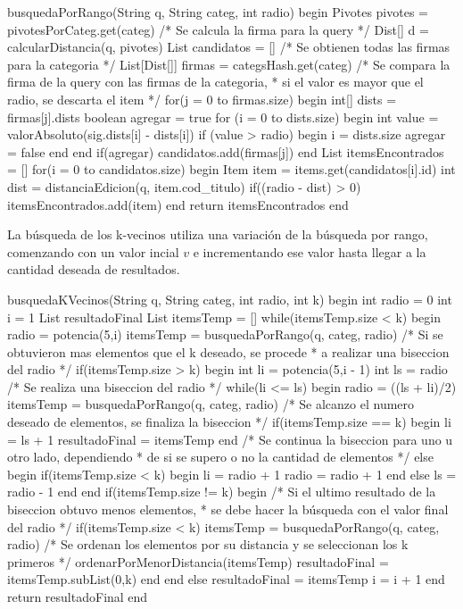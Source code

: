 \begin{algorithm}[caption={B\'usqueda por rango}, label={alg4}]
busquedaPorRango(String q, String categ, int radio)
begin
 Pivotes pivotes = pivotesPorCateg.get(categ)
 /* Se calcula la firma para la query */
 Dist[] d = calcularDistancia(q, pivotes)
 List candidatos = []
 /* Se obtienen todas las firmas para la categoria */
 List[Dist[]] firmas = categsHash.get(categ)
 /* Se compara la firma de la query con las firmas de la categoria, 
  * si el valor es mayor que el radio, se descarta el item */
 for(j = 0 to firmas.size)
 begin
  int[] dists = firmas[j].dists
  boolean agregar = true
  for (i = 0 to dists.size)
  begin
   int value = valorAbsoluto(sig.dists[i] - dists[i])
   if (value > radio)
   begin
    i = dists.size
    agregar = false
   end
  end
  if(agregar)
   candidatos.add(firmas[j])
 end
 List itemsEncontrados = []
 for(i = 0 to candidatos.size)
 begin
  Item item = items.get(candidatos[i].id)
  int dist = distanciaEdicion(q, item.cod_titulo)
  if((radio - dist) > 0)
   itemsEncontrados.add(item)
 end
 return itemsEncontrados
end
\end{algorithm}

La b\'usqueda de los k-vecinos utiliza una variaci\'on de la b\'usqueda por rango, comenzando con un valor incial $v$ e incrementando ese valor hasta llegar a la cantidad deseada de resultados.\\
\begin{algorithm}[caption={B\'usqueda de los k-vecinos}, label={alg5}]
busquedaKVecinos(String q, String categ, int radio, int k)
begin
 int radio = 0
 int i = 1
 List resultadoFinal
 List itemsTemp = []
 while(itemsTemp.size < k)
 begin
  radio = potencia(5,i)
  itemsTemp = busquedaPorRango(q, categ, radio)
  /* Si se obtuvieron mas elementos que el k deseado, se procede 
   * a realizar una biseccion del radio */
  if(itemsTemp.size > k)
  begin
   int li = potencia(5,i - 1)
   int ls = radio
   /* Se realiza una biseccion del radio */
   while(li <= ls)
   begin
    radio = ((ls + li)/2)
    itemsTemp = busquedaPorRango(q, categ, radio)
    /* Se alcanzo el numero deseado de elementos, se finaliza la biseccion */
    if(itemsTemp.size == k)
    begin
     li = ls + 1
     resultadoFinal = itemsTemp
    end
    /* Se continua la biseccion para uno u otro lado, dependiendo 
     * de si se supero o no la cantidad de elementos */
    else
    begin
     if(itemsTemp.size < k)
     begin
      li = radio + 1
      radio = radio + 1
     end
     else
      ls = radio - 1
    end
   end
   if(itemsTemp.size != k)
   begin
    /* Si el ultimo resultado de la biseccion obtuvo menos elementos,
     * se debe hacer la b\'usqueda con el valor final del radio */
    if(itemsTemp.size < k)
     itemsTemp = busquedaPorRango(q, categ, radio)
    /* Se ordenan los elementos por su distancia y se seleccionan los k primeros */
    ordenarPorMenorDistancia(itemsTemp)
    resultadoFinal = itemsTemp.subList(0,k)
   end
  end
  else
   resultadoFinal = itemsTemp
  i = i + 1 
 end
 return resultadoFinal
end
\end{algorithm}

